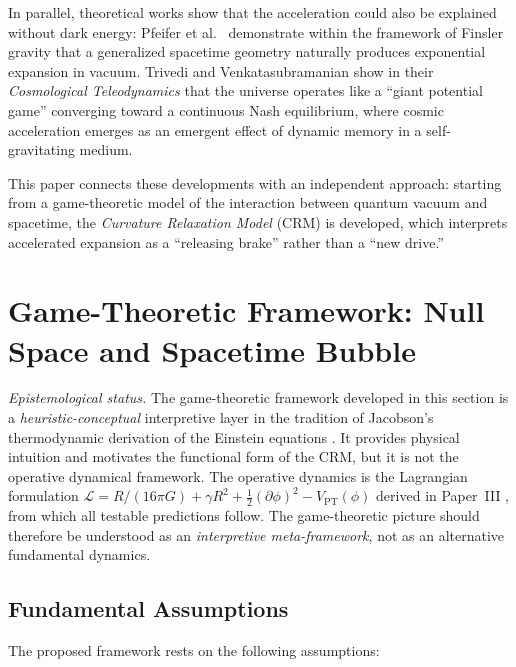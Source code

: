 \documentclass[aps,prd,twocolumn,superscriptaddress,nofootinbib]{revtex4-2}
\begin{document}
In parallel, theoretical works show that the acceleration could also be explained without dark energy: Pfeifer et al.\ \cite{Pfeifer2025} demonstrate within the framework of Finsler gravity that a generalized spacetime geometry naturally produces exponential expansion in vacuum. Trivedi and Venkatasubramanian \cite{Trivedi2025} show in their \textit{Cosmological Teleodynamics} that the universe operates like a ``giant potential game'' converging toward a continuous Nash equilibrium, where cosmic acceleration emerges as an emergent effect of dynamic memory in a self-gravitating medium.

This paper connects these developments with an independent approach: starting from a game-theoretic model of the interaction between quantum vacuum and spacetime, the \textit{Curvature Relaxation Model} (CRM) is developed, which interprets accelerated expansion as a ``releasing brake'' rather than a ``new drive.''


\section{Game-Theoretic Framework: Null Space and Spacetime Bubble}
\label{sec:gametheory}

\textit{Epistemological status.} The game-theoretic framework developed in this section is a \emph{heuristic-conceptual} interpretive layer in the tradition of Jacobson's thermodynamic derivation of the Einstein equations \cite{Jacobson1995}. It provides physical intuition and motivates the functional form of the CRM, but it is not the operative dynamical framework. The operative dynamics is the Lagrangian formulation $\mathcal{L} = R/(16\pi G) + \gamma R^2 + \frac{1}{2}(\partial\phi)^2 - V_{\mathrm{PT}}(\phi)$ derived in Paper~III \cite{Geiger2026c}, from which all testable predictions follow. The game-theoretic picture should therefore be understood as an \emph{interpretive meta-framework}, not as an alternative fundamental dynamics.

\subsection{Fundamental Assumptions}
\label{subsec:assumptions}

The proposed framework rests on the following assumptions:
\end{document}
